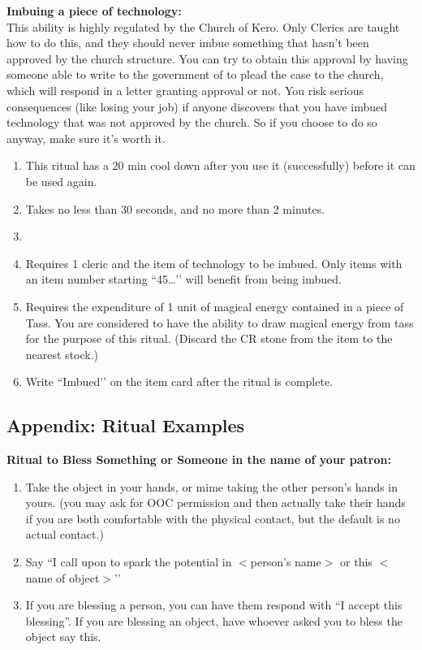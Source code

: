 \documentclass[green]{GL2020}
\begin{document}
\textbf{Imbuing a piece of technology:}\\
This ability is highly regulated by the Church of Kero. Only Clerics are taught how to do this, and they should never imbue something that hasn’t been approved by the church structure. You can try to obtain this approval by having someone able to write to the government of \pTech{} to plead the case to the church, which will respond in a letter granting approval or not. You risk serious consequences (like losing your job) if anyone discovers that you have imbued technology that was not approved by the church. So if you choose to do so anyway, make sure it’s worth it.
  \begin{enumerate}
    \item This ritual has a 20 min cool down after you use it (successfully) before it can be used again.
    \item Takes no less than 30 seconds, and no more than 2 minutes.
    \item 
    \item Requires 1 cleric and the item of technology to be imbued. Only items with an item number starting ``45…’’ will benefit from being imbued.
		\item Requires the expenditure of 1 unit of magical energy contained in a piece of Tass. You are considered to have the ability to draw magical energy from tass for the purpose of this ritual. (Discard the CR stone from the item to the nearest stock.)
		\item Write ``Imbued’’ on the item card after the ritual is complete.
  \end{enumerate}

\subsection*{Appendix: Ritual Examples}

\textbf{Ritual to Bless Something or Someone in the name of your patron:}
  \begin{enumerate}
    \item Take the object in your hands, or mime taking the other person’s hands in yours. (you may ask for OOC permission and then actually take their hands if you are both comfortable with the physical contact, but the default is no actual contact.)
    \item Say ``I call upon \cTechGod{} to spark the potential in $<$person’s name$>$ or this $<$ name of object$>$’’
    \item If you are blessing a person, you can have them respond with ``I accept this blessing''. If you are blessing an object, have whoever asked you to bless the object say this.
  \end{enumerate}
\end{document}
